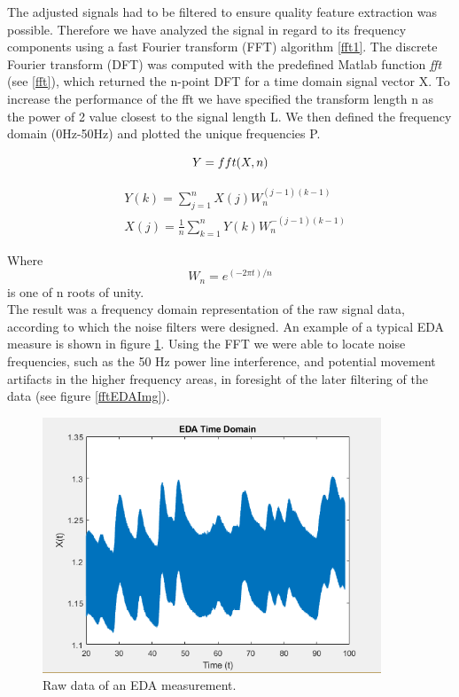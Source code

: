 The adjusted signals had to be filtered to ensure quality feature extraction was possible. Therefore we have analyzed the signal in regard to its frequency components using a fast Fourier transform (FFT) algorithm \ref{fft1}. The discrete Fourier transform (DFT) was computed with the predefined Matlab function \textit{fft} (see \ref{fft}), which returned the n-point DFT for a time domain signal vector X. To increase the performance of the fft we have specified the transform length n as the power of 2 value closest to the signal length L. We then defined the frequency domain (0Hz-50Hz) and plotted the unique frequencies P.

\begin{equation}\label{fft}
Y = fft(X,n) \\
\end{equation}

\begin{align}\label{fft1}
& Y(k) = \sum\limits_{j=1}^n X(j) W_{n}^{(j-1)(k-1)} \\
& X(j) = \frac{1}{n} \sum\limits_{k=1}^n Y(k) W_{n}^{-(j-1)(k-1)} 
\end{align} 

Where
\begin{equation}
W_{n} = e^{(-2\pi t)/n}
\end{equation}
is one of n roots of unity.\\

The result was a frequency domain representation of the raw signal data, according to which the noise filters were designed. An example of a typical EDA measure is shown in figure \ref{rawEDAImg}. Using the FFT we were able to locate noise frequencies, such as the 50 Hz power line interference, and potential movement artifacts in the higher frequency areas, in foresight of the later filtering of the data (see figure \ref{fftEDAImg}).

\begin{figure}[ht]
\centering
\includegraphics[width=0.9\textwidth]{images/rawEDA.png}
\caption{Raw data of an EDA measurement.}
\label{rawEDAImg}
\end{figure}

